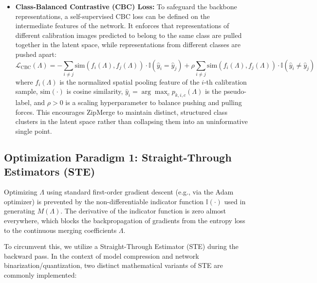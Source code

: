 \begin{itemize}[leftmargin=*]
\begin{equation}
    \end{equation}
    which acts as a structural anchor to prevent transductive overfitting by penalizing any massive deviations from the original high-confidence class predictions.
    \item \textbf{Class-Balanced Contrastive (CBC) Loss:} To safeguard the backbone representations, a self-supervised CBC loss can be defined on the intermediate features of the network. It enforces that representations of different calibration images predicted to belong to the same class are pulled together in the latent space, while representations from different classes are pushed apart:
    \begin{equation}
        \mathcal{L}_{\text{CBC}}(\Lambda) = -\sum_{i \neq j} \text{sim}(f_i(\Lambda), f_j(\Lambda)) \cdot \mathbb{I}(\hat{y}_i = \hat{y}_j) + \rho \sum_{i \neq j} \text{sim}(f_i(\Lambda), f_j(\Lambda)) \cdot \mathbb{I}(\hat{y}_i \neq \hat{y}_j)
    \end{equation}
    where $f_i(\Lambda)$ is the normalized spatial pooling feature of the $i$-th calibration sample, $\text{sim}(\cdot)$ is cosine similarity, $\hat{y}_i = \arg\max_c p_{k,i,c}(\Lambda)$ is the pseudo-label, and $\rho > 0$ is a scaling hyperparameter to balance pushing and pulling forces. This encourages ZipMerge to maintain distinct, structured class clusters in the latent space rather than collapsing them into an uninformative single point.
\end{itemize}

\subsection{Optimization Paradigm 1: Straight-Through Estimators (STE)}

Optimizing $\Lambda$ using standard first-order gradient descent (e.g., via the Adam optimizer) is prevented by the non-differentiable indicator function $\mathbb{I}(\cdot)$ used in generating $M(\Lambda)$. The derivative of the indicator function is zero almost everywhere, which blocks the backpropagation of gradients from the entropy loss to the continuous merging coefficients $\Lambda$.

To circumvent this, we utilize a Straight-Through Estimator (STE) \cite{bengio2013estimating} during the backward pass. In the context of model compression and network binarization/quantization, two distinct mathematical variants of STE are commonly implemented:

